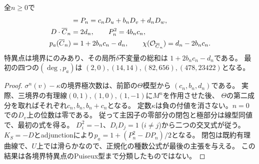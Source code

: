 \begin{theorem}[境界に集中する算術種数]
\label{thm:boundary-curve-genus}
全$n\ge0$で
\begin{align*}
 [\overline C_n]&=P_n=c_nD_u+b_nD_v+d_nD_w,\\
 D\cdot\overline C_n&=2d_n,\qquad P_n^2=4b_nc_n,\\
 p_a(\overline C_n)&=1+2b_nc_n-d_n,
 \qquad \chi(\OO_{\overline C_n})=d_n-2b_nc_n.
\end{align*}
特異点は境界にのみあり、その局所$\delta$不変量の総和は
$1+2b_nc_n-d_n$である。
最初の四つの$(\deg, p_a)$は
$(2,0),(14,14),(82,656),(478,23422)$となる。
\end{theorem}
\begin{proof}
$\sigma^n(v)-\kappa$の境界極次数は、前節の$\Theta$模型から
$(c_n,b_n,d_n)$である。
実際、三境界の有理線$(0,1),(1,0),(1,-1)$に$M^n$を作用させた後、
$\Theta$の第二成分を取ればそれぞれ$c_n,b_n,b_n+c_n$となる。
定数$\kappa$は負の付値を消さない。$n=0$での$D_v$上の位数は零である。
従って主因子の零部分の閉包と極部分は線型同値で、最初の式を得る。
$D_i^2=-1$、$D_iD_j=1$ ($i\ne j$)から二つの交叉式が従う。
$K_S=-D$とadjunctionにより$p_a=1+(P_n^2-DP_n)/2$となる。
閉包は既約有理曲線で、$U$上では滑らかなので、正規化の種数公式が最後の主張を与える。
この結果は各境界特異点のPuiseux型まで分類したものではない。
\end{proof}

